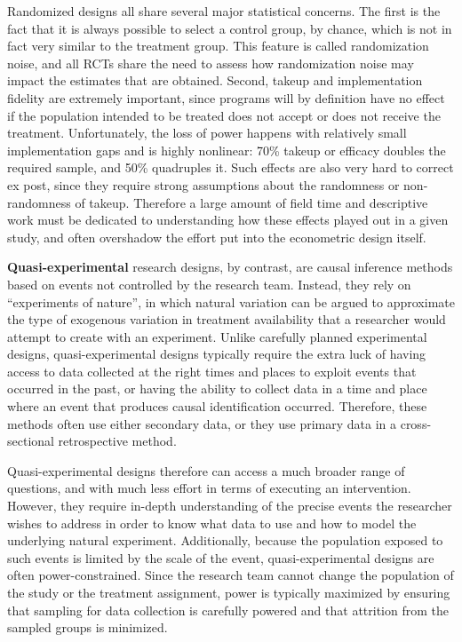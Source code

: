 Randomized designs all share several major statistical concerns.
The first is the fact that it is always possible to select a control group,
by chance, which is not in fact very similar to the treatment group.
This feature is called randomization noise, and all RCTs share the need to assess
how randomization noise may impact the estimates that are obtained.
Second, takeup and implementation fidelity are extremely important,
since programs will by definition have no effect
if the population intended to be treated
does not accept or does not receive the treatment.
Unfortunately, the loss of power happens with relatively small implementation gaps and is highly nonlinear:
70\% takeup or efficacy doubles the required sample, and 50\% quadruples it.
Such effects are also very hard to correct ex post,
since they require strong assumptions about the randomness or non-randomness of takeup.
Therefore a large amount of field time and descriptive work
must be dedicated to understanding how these effects played out in a given study,
and often overshadow the effort put into the econometric design itself.

\textbf{Quasi-experimental} research designs,
by contrast, are causal inference methods based on events not controlled by the research team.
Instead, they rely on ``experiments of nature'',
in which natural variation can be argued to approximate
the type of exogenous variation in treatment availability
that a researcher would attempt to create with an experiment.\cite{dinardo2016natural}
Unlike carefully planned experimental designs,
quasi-experimental designs typically require the extra luck
of having access to data collected at the right times and places
to exploit events that occurred in the past,
or having the ability to collect data in a time and place
where an event that produces causal identification occurred.
Therefore, these methods often use either secondary data,
or they use primary data in a cross-sectional retrospective method.

Quasi-experimental designs therefore can access a much broader range of questions,
and with much less effort in terms of executing an intervention.
However, they require in-depth understanding of the precise events
the researcher wishes to address in order to know what data to use
and how to model the underlying natural experiment.
Additionally, because the population exposed
to such events is limited by the scale of the event,
quasi-experimental designs are often power-constrained.
Since the research team cannot change the population of the study
or the treatment assignment, power is typically maximized by ensuring
that sampling for data collection is carefully powered
and that attrition from the sampled groups is minimized.


